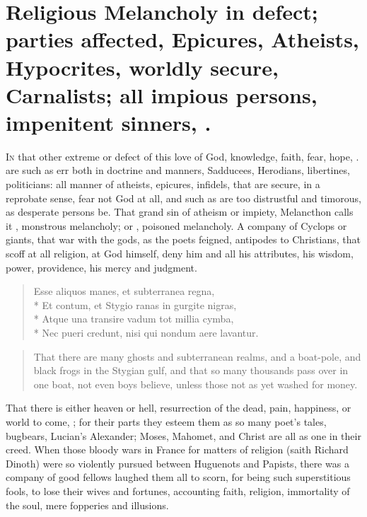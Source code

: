 {%

\section[Religious Melancholy in defect]{Religious Melancholy in defect; parties affected, Epicures, Atheists, Hypocrites, worldly secure, Carnalists; all impious persons, impenitent sinners, \etc{}.}

\lettrine{I}{n} that other extreme or defect of this love of God, knowledge, faith,
fear, hope, \etc{}. are such as err both in doctrine and manners,
Sadducees, Herodians, libertines, politicians: all manner of atheists,
epicures, infidels, that are secure, in a reprobate sense, fear not God
at all, and such as are too distrustful and timorous, as desperate persons
be. That grand sin of atheism or impiety, Melancthon calls it
, monstrous melancholy; or , poisoned melancholy. A company of Cyclops or giants, that
war with the gods, as the poets feigned, antipodes to Christians, that
scoff at all religion, at God himself, deny him and all his attributes,
his wisdom, power, providence, his mercy and judgment.

\begin{latin}
\begin{verse}
Esse aliquos manes, et subterranea regna,\\*
Et contum, et Stygio ranas in gurgite nigras,\\*
Atque una transire vadum tot millia cymba,\\*
Nec pueri credunt, nisi qui nondum aere lavantur.
\end{verse}
\end{latin}

\begin{quote}
 That there are many ghosts and subterranean realms, and a boat-pole, and black frogs in the Stygian gulf, and that so many thousands pass over in one boat, not even boys believe, unless those not as yet washed for money.
\end{quote}

That there is either heaven or hell, resurrection of the dead, pain,
happiness, or world to come, ; for their parts
they esteem them as so many poet's tales, bugbears, Lucian's Alexander;
Moses, Mahomet, and Christ are all as one in their creed. When those
bloody wars in France for matters of religion (saith Richard
Dinoth) were so violently pursued between Huguenots and Papists, there
was a company of good fellows laughed them all to scorn, for being such
superstitious fools, to lose their wives and fortunes, accounting
faith, religion, immortality of the soul, mere fopperies and illusions.

}

